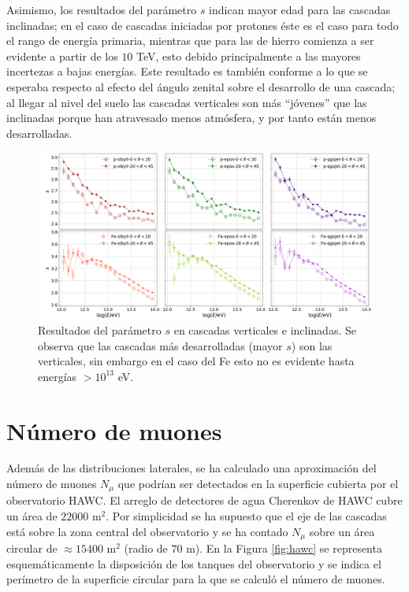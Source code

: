 \documentclass[12pt,letterpaper]{report}
\begin{document}
	Asimismo, los resultados del par\'ametro $s$ indican mayor edad para las cascadas inclinadas; en el caso de cascadas iniciadas por protones \'este es el caso para todo el rango de energ\'ia primaria, mientras que para las de hierro comienza a ser evidente a partir de los $10$ TeV, esto debido principalmente a las mayores incertezas a bajas energ\'ias. Este resultado es tambi\'en conforme a lo que se esperaba respecto al efecto del \'angulo zenital sobre el desarrollo de una cascada; al llegar al nivel del suelo las cascadas verticales son m\'as ``j\'ovenes'' que las inclinadas porque han atravesado menos atm\'osfera, y por tanto est\'an menos desarrolladas. 
		\begin{figure} [h]
		\includegraphics[width=\textwidth]{Figuras/theta_nkgs}
		\caption{Resultados del par\'ametro $s$ en cascadas verticales e inclinadas. Se observa que las cascadas m\'as desarrolladas (mayor $s$) son las verticales, sin embargo en el caso del Fe esto no es evidente hasta energ\'ias $>10^{13}$ eV.}
		\label{fig:theta_nkgs}
		\end{figure}

\section{N\'umero de muones}
Adem\'as de las distribuciones laterales, se ha calculado una aproximaci\'on del n\'umero de muones $N_{\mu}$ que podr\'ian ser detectados en la superficie cubierta por el observatorio HAWC. El arreglo de detectores de agua Cherenkov de HAWC cubre un \'area de $22000$ m$^2$. Por simplicidad se ha supuesto que el eje de las cascadas est\'a sobre la zona central del observatorio y se ha contado $N_{\mu}$ sobre un \'area circular de $\approx 15400$ m$^2$ (radio de $70$ m). En la Figura \ref{fig:hawc} se representa esquem\'aticamente la disposici\'on de los tanques del observatorio y se indica el per\'imetro de la superficie circular para la que se calcul\'o el n\'umero de muones.\\
\end{document}
